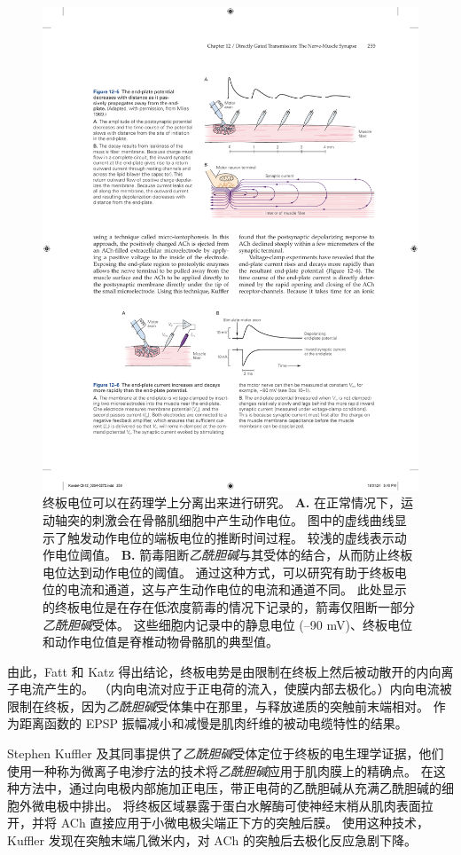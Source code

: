 \begin{figure}[htbp]
	\centering
	\includegraphics[width=0.8\linewidth]{chap12/fig_12_4}
	\caption{终板电位可以在药理学上分离出来进行研究。
		\textbf{A.} 在正常情况下，运动轴突的刺激会在骨骼肌细胞中产生动作电位。
		图中的虚线曲线显示了触发动作电位的端板电位的推断时间过程。
		较浅的虚线表示动作电位阈值。
		\textbf{B.} 箭毒阻断\textit{乙酰胆碱}与其受体的结合，从而防止终板电位达到动作电位的阈值。
		通过这种方式，可以研究有助于终板电位的电流和通道，这与产生动作电位的电流和通道不同。
		此处显示的终板电位是在存在低浓度箭毒的情况下记录的，箭毒仅阻断一部分\textit{乙酰胆碱}受体。
		这些细胞内记录中的静息电位 (–90 mV)、终板电位和动作电位值是脊椎动物骨骼肌的典型值。}
	\label{fig:12_4}
\end{figure}


由此，Fatt 和 Katz 得出结论，终板电势是由限制在终板上然后被动散开的内向离子电流产生的。
（内向电流对应于正电荷的流入，使膜内部去极化。）内向电流被限制在终板，因为\textit{乙酰胆碱}受体集中在那里，与释放递质的突触前末端相对。
作为距离函数的 EPSP 振幅减小和减慢是肌肉纤维的被动电缆特性的结果。


Stephen Kuffler 及其同事提供了\textit{乙酰胆碱}受体定位于终板的电生理学证据，他们使用一种称为微离子电渗疗法的技术将\textit{乙酰胆碱}应用于肌肉膜上的精确点。
在这种方法中，通过向电极内部施加正电压，带正电荷的乙酰胆碱从充满乙酰胆碱的细胞外微电极中排出。
将终板区域暴露于蛋白水解酶可使神经末梢从肌肉表面拉开，并将 ACh 直接应用于小微电极尖端正下方的突触后膜。
使用这种技术，Kuffler 发现在突触末端几微米内，对 ACh 的突触后去极化反应急剧下降。


